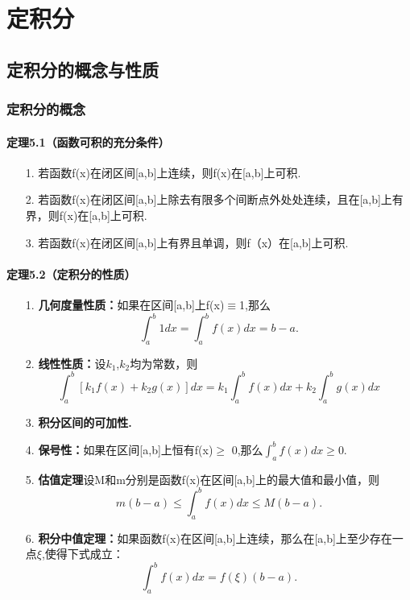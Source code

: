 \documentclass[12pt, a4paper, oneside]{ctexart}
\begin{document}
\newpage
\section{定积分}
\vskip 2cm
\subsection{定积分的概念与性质}
\vskip 1cm
\subsubsection{定积分的概念}
\paragraph{定理5.1（函数可积的充分条件）}
\begin{enumerate}
	\item [1.]若函数f(x)在闭区间[a,b]上连续，则f(x)在[a,b]上可积.
	\item [2.]若函数f(x)在闭区间[a,b]上除去有限多个间断点外处处连续，且在[a,b]上有界，则f(x)在[a,b]上可积.
	\item [3.]若函数f(x)在闭区间[a,b]上有界且单调，则f（x）在[a,b]上可积.
\end{enumerate}


\paragraph{定理5.2（定积分的性质）}
\begin{enumerate}
	\item [1.]\textbf{几何度量性质：}如果在区间[a,b]上f(x)$\equiv $1,那么
	\begin{equation}
		\int_{a}^{b}1dx=\int_{a}^{b}f(x)dx=b-a.
	\end{equation}
	\item [2.]\textbf{线性性质：}设$k_{1}^{}$,$k_{2}^{}$均为常数，则
	\begin{equation}
		\int_{a}^{b}[k_{1}^{}f(x)+k_{2}^{}g(x)]dx=k_{1}^{}\int_{a}^{b}f(x)dx+k_{2}^{}\int_{a}^{b}g(x)dx
	\end{equation}
	\item [3.]\textbf{积分区间的可加性.}
	\item [4.]\textbf{保号性：}如果在区间[a,b]上恒有f(x)$\geq$ 0,那么$\int _{a}^{b}f(x)dx\geq $0.
	\item [5.]\textbf{估值定理}设M和m分别是函数f(x)在区间[a,b]上的最大值和最小值，则
	\begin{equation}
		m(b-a)\leq \int _{a}^{b}f(x)dx\leq M(b-a).
	\end{equation}
	\item [6.]\textbf{积分中值定理：}如果函数f(x)在区间[a,b]上连续，那么在[a,b]上至少存在一点$\xi$,使得下式成立：
	\begin{equation}
		\int _{a}^{b}f(x)dx=f(\xi)(b-a).
	\end{equation}
\end{enumerate}
\end{document}

